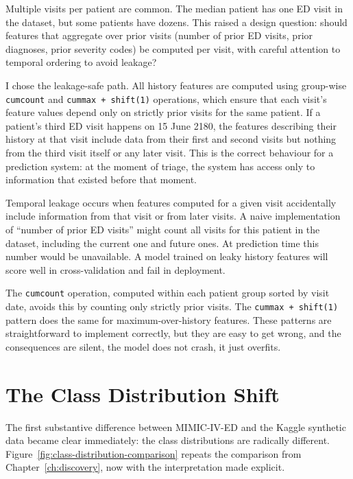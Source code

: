 Multiple visits per patient are common. The median patient has one ED visit in the dataset, but some patients have dozens. This raised a design question: should features that aggregate over prior visits (number of prior ED visits, prior diagnoses, prior severity codes) be computed per visit, with careful attention to temporal ordering to avoid leakage?

I chose the leakage-safe path. All history features are computed using group-wise \texttt{cumcount} and \texttt{cummax + shift(1)} operations, which ensure that each visit's feature values depend only on strictly prior visits for the same patient. If a patient's third ED visit happens on 15 June 2180, the features describing their history at that visit include data from their first and second visits but nothing from the third visit itself or any later visit. This is the correct behaviour for a prediction system: at the moment of triage, the system has access only to information that existed before that moment.

\begin{notebox}
Temporal leakage occurs when features computed for a given visit accidentally include information from that visit or from later visits. A naive implementation of ``number of prior ED visits'' might count all visits for this patient in the dataset, including the current one and future ones. At prediction time this number would be unavailable. A model trained on leaky history features will score well in cross-validation and fail in deployment.

The \texttt{cumcount} operation, computed within each patient group sorted by visit date, avoids this by counting only strictly prior visits. The \texttt{cummax + shift(1)} pattern does the same for maximum-over-history features. These patterns are straightforward to implement correctly, but they are easy to get wrong, and the consequences are silent, the model does not crash, it just overfits.
\end{notebox}

\section{The Class Distribution Shift}

The first substantive difference between MIMIC-IV-ED and the Kaggle synthetic data became clear immediately: the class distributions are radically different. Figure~\ref{fig:class-distribution-comparison} repeats the comparison from Chapter~\ref{ch:discovery}, now with the interpretation made explicit.


